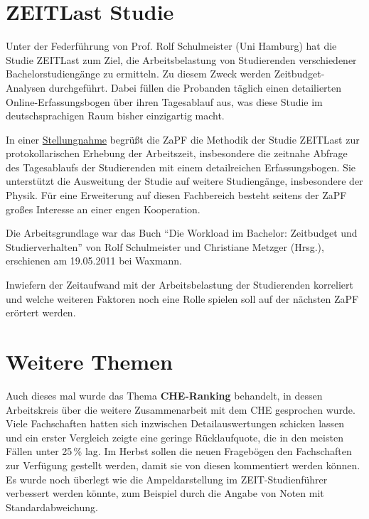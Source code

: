 \documentclass{scrartcl}
\begin{document}
\section*{ZEITLast Studie}
\vspace{-12pt}
Unter der Federführung von Prof. Rolf Schulmeister (Uni Hamburg) hat die Studie ZEITLast zum Ziel, die Arbeitsbelastung
von Studierenden verschiedener Bachelorstudiengänge zu ermitteln. Zu diesem Zweck werden Zeitbudget-Analysen
durchgeführt. Dabei füllen die Probanden täglich einen detailierten Online-Erfassungsbogen über ihren Tagesablauf aus,
was diese Studie im deutschsprachigen Raum bisher einzigartig macht.

In einer \href{http://zapfev.de/sites/default/files/2011_05_Stellungnahme_ZEITlast.pdf}{Stellungnahme} begrüßt die ZaPF
die Methodik der Studie ZEITLast zur protokollarischen Erhebung der Arbeitszeit,
insbesondere die zeitnahe Abfrage des Tagesablaufs der Studierenden mit einem detailreichen Erfassungsbogen. Sie
unterstützt die Ausweitung der Studie auf weitere Studiengänge, insbesondere der Physik. Für eine Erweiterung auf diesen
Fachbereich besteht seitens der ZaPF großes Interesse an einer engen Kooperation.

Die Arbeitsgrundlage war das Buch “Die Workload im
Bachelor: Zeitbudget und Studierverhalten” von Rolf Schulmeister und Christiane Metzger (Hrsg.), erschienen am
19.05.2011 bei Waxmann.

Inwiefern der Zeitaufwand mit der Arbeitsbelastung der Studierenden korreliert und welche weiteren Faktoren noch eine
Rolle spielen soll auf der nächsten ZaPF erörtert werden.

\section*{Weitere Themen}
\vspace{-12pt}
Auch dieses mal wurde das Thema \textbf{CHE-Ranking} behandelt, in dessen Arbeitskreis über die weitere Zusammenarbeit
mit dem CHE
gesprochen wurde. Viele Fachschaften hatten sich inzwischen Detailauswertungen schicken lassen und ein erster Vergleich
zeigte eine geringe Rücklaufquote, die in den meisten Fällen unter 25\,\% lag. Im Herbst sollen die neuen Fragebögen den
Fachschaften zur Verfügung gestellt werden, damit sie von diesen kommentiert werden können. Es wurde noch überlegt wie
die Ampeldarstellung im ZEIT-Studienführer verbessert werden könnte, zum Beispiel durch die
Angabe von Noten mit Standardabweichung.
\end{document}
